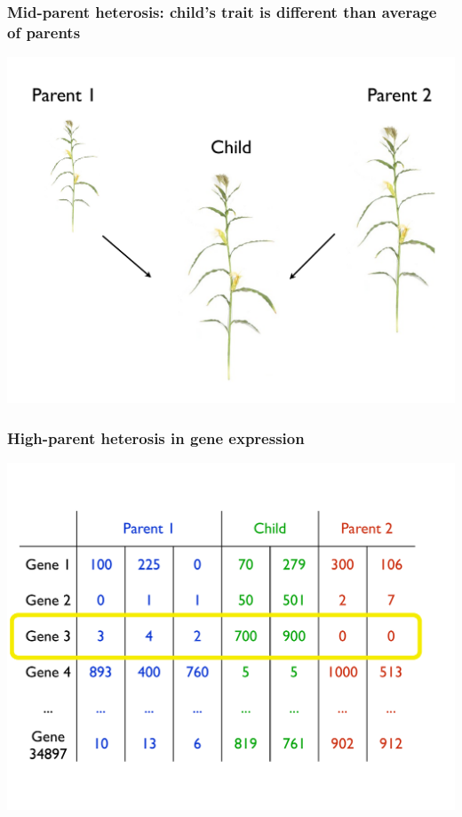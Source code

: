 \documentclass[handout]{beamer}
\numberwithin{equation}{section}
\begin{document}
\begin{frame}
\frametitle{Mid-parent heterosis: child's trait is different than average of parents}
\begin{center}
\includegraphics[scale=.3]{fig/mph}
\end{center}
\end{frame}



\begin{frame}
\frametitle{High-parent heterosis in gene expression}
\begin{center}
\includegraphics[scale=.35]{fig/hphrnaseq}
\end{center}
\end{frame}
\end{document}
